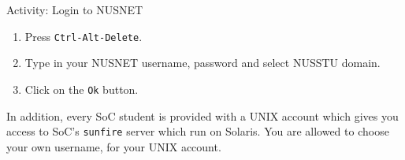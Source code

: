 \begin{frame}{Activity: Login to NUSNET}
\begin{enumerate}
\item Press \texttt{Ctrl-Alt-Delete}.
\item Type in your NUSNET username, password and select NUSSTU domain.  
\item Click on the \texttt{Ok} button.  
\end{enumerate}
\end{frame}

In addition, every SoC student is provided with a UNIX account which gives you
access to SoC's \texttt{sunfire} server which run on Solaris. You are allowed to
choose your own username, for your UNIX account.  

